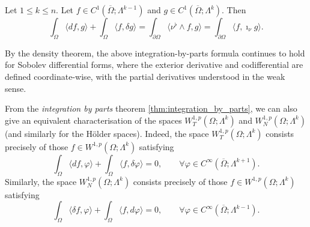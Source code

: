 \begin{theorem}
\label{thm:integration_by_parts}
Let $1\leq k\leq n$. Let
$f\in C^1(\overline{\Omega};\Lambda^{k-1})$ and
$g\in C^1(\overline{\Omega};\Lambda^k)$. Then
\[
    \int_\Omega \langle df,g\rangle
    +\int_\Omega \langle f,\delta g\rangle
    =
    \int_{\partial\Omega}
    \langle \nu^\flat\wedge f,g\rangle
    =
    \int_{\partial\Omega}
    \langle f,\imath_\nu g\rangle.
\]
\end{theorem}

\begin{remark}
By the density theorem, the above integration-by-parts formula
continues to hold for Sobolev differential forms, where the exterior
derivative and codifferential are defined coordinate-wise, with the
partial derivatives understood in the weak sense.
\end{remark} 
From the \emph{integration by parts} theorem \ref{thm:integration_by_parts}, we can also give an equivalent characterisation of the spaces
$W^{1,p}_T(\Omega;\Lambda^k)$ and
$W^{1,p}_N(\Omega;\Lambda^k)$ (and similarly for the Hölder spaces).
Indeed, the space $W^{1,p}_T(\Omega;\Lambda^k)$ consists precisely
of those $f\in W^{1,p}(\Omega;\Lambda^k)$ satisfying
\[
    \int_\Omega \langle df,\varphi\rangle
    +\int_\Omega \langle f,\delta\varphi\rangle
    =0,
    \qquad
    \forall\varphi\in C^\infty(\overline{\Omega};\Lambda^{k+1}).
\]
Similarly, the space $W^{1,p}_N(\Omega;\Lambda^k)$ consists precisely
of those $f\in W^{1,p}(\Omega;\Lambda^k)$ satisfying
\[
    \int_\Omega \langle \delta f,\varphi\rangle
    +\int_\Omega \langle f,d\varphi\rangle
    =0,
    \qquad
    \forall\varphi\in C^\infty(\overline{\Omega};\Lambda^{k-1}).
\]

